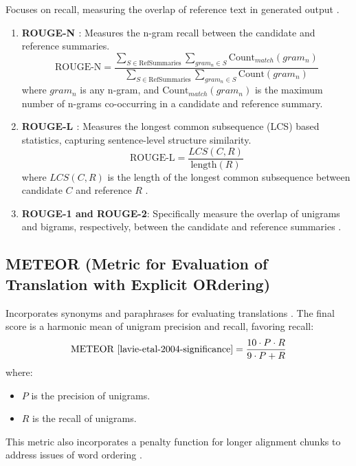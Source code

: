 Focuses on recall, measuring the overlap of reference text in generated output \cite{Ng2015Better}.

\begin{enumerate}
    \item \textbf{ROUGE-N \cite{Maples2017TheR}}: Measures the n-gram recall between the candidate and reference summaries.
    \[
    \text{ROUGE-N} = \frac{\sum_{S \in \text{RefSummaries}} \sum_{gram_n \in S} \text{Count}_{match}(gram_n)}{\sum_{S \in \text{RefSummaries}} \sum_{gram_n \in S} \text{Count}(gram_n)}
    \]
    where \( gram_n \) is any n-gram, and \( \text{Count}_{match}(gram_n) \) is the maximum number of n-grams co-occurring in a candidate and reference summary.

    \item \textbf{ROUGE-L \cite{lin-2004-rouge}}: Measures the longest common subsequence (LCS) based statistics, capturing sentence-level structure similarity.
    \[
    \text{ROUGE-L} = \frac{LCS(C, R)}{\text{length}(R)}
    \]
    where \( LCS(C, R) \) is the length of the longest common subsequence between candidate \( C \) and reference \( R \) \cite{Ng2015Better}.

    \item \textbf{ROUGE-1 and ROUGE-2}: Specifically measure the overlap of unigrams and bigrams, respectively, between the candidate and reference summaries \cite{Ganesan2015ROUGE}.
\end{enumerate}

\subsection{METEOR (Metric for Evaluation of Translation with Explicit ORdering) \cite{Dobre2015ACB}}

Incorporates synonyms and paraphrases for evaluating translations \cite{Agarwal2008Meteor}. The final score is a harmonic mean of unigram precision and recall, favoring recall:
\[
\text{METEOR \cite{lavie-etal-2004-significance}} = \frac{10 \cdot P \cdot R}{9 \cdot P + R}
\]
where:
\begin{itemize}
    \item \( P \) is the precision of unigrams.
    \item \( R \) is the recall of unigrams.
\end{itemize}

This metric also incorporates a penalty function for longer alignment chunks to address issues of word ordering \cite{Agarwal2008Meteor}.

